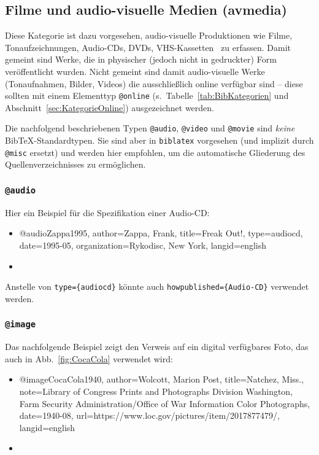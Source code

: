 \subsection{Filme und audio-visuelle Medien (\textsf{avmedia})}
\label{sec:KategorieAvmedia}

Diese Kategorie ist dazu vorgesehen, audio-visuelle Produktionen wie Filme,
Tonaufzeichnungen, Audio-CDs, DVDs, VHS-Kassetten \usw\ zu erfassen. Damit
gemeint sind Werke, die in physischer (jedoch nicht in gedruckter) Form
veröffentlicht wurden. Nicht gemeint sind damit audio-visuelle Werke
(Tonaufnahmen, Bilder, Videos) die ausschließlich online verfügbar sind --
diese sollten mit einem Elementtyp \texttt{@online} (s.\
Tabelle~\ref{tab:BibKategorien} und Abschnitt~\ref{sec:KategorieOnline})
ausgezeichnet werden.

Die nachfolgend beschriebenen Typen \texttt{@audio}, \texttt{@video} und
\texttt{@movie} sind \emph{keine} Bib\-TeX-Standardtypen. Sie sind aber in
\texttt{biblatex} vorgesehen (und implizit durch \texttt{@misc} ersetzt) und
werden hier empfohlen, um die automatische Gliederung des
Quellenverzeichnisses zu ermöglichen.


\subsubsection{\texttt{\bfseries @audio}}
\label{sec:@audio}
Hier ein Beispiel für die Spezifikation einer Audio-CD:
%
\begin{itemize}
\item[]
\begin{GenericCode}[numbers=none]
@audio{Zappa1995,
  author={Zappa, Frank},
  title={Freak Out!},
  type={audiocd},
  date={1995-05},
  organization={Rykodisc, New York},
  langid={english}
}
\end{GenericCode}
\item[\cite{Zappa1995}] 
\end{itemize}
%
Anstelle von \verb!type={audiocd}! könnte auch \verb!howpublished={Audio-CD}!
verwendet werden.


\subsubsection{\texttt{\bfseries @image}}
\label{sec:@image}

Das nachfolgende Beispiel zeigt den Verweis auf ein digital verfügbares Foto,
das auch in Abb.\ \ref{fig:CocaCola} verwendet wird:
%
\begin{itemize}
\item[]
\begin{GenericCode}[numbers=none]
@image{CocaCola1940,
  author={Wolcott, Marion Post},
  title={Natchez, Miss.},
  note={Library of Congress Prints and Photographs Division Washington, Farm Security Administration/Office of War Information Color Photographs},
  date={1940-08},
  url={https://www.loc.gov/pictures/item/2017877479/},
  langid={english}
}
\end{GenericCode}
\item[\cite{CocaCola1940}] 
\end{itemize}



